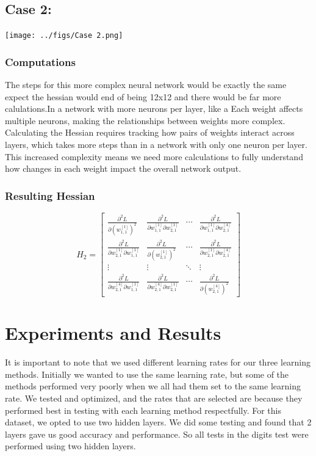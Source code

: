 \documentclass{article}
\begin{document}
\subsection{Case 2:}

\texttt{[image: ../figs/Case 2.png]} \\[0.5cm]

\subsubsection{Computations}
The steps for this more complex neural network would be exactly the same expect the hessian would end of being 12x12 and there would be far more calulations.In a network with more neurons per layer, like a Each weight affects multiple neurons, making the relationships between weights more complex. Calculating the Hessian requires tracking how pairs of weights interact across layers, which takes more steps than in a network with only one neuron per layer. This increased complexity means we need more calculations to fully understand how changes in each weight impact the overall network output.

\subsubsection{Resulting Hessian}
\[
H_2 = \begin{bmatrix}
\frac{\partial^2 L}{\partial (w_{1,1}^{[1]})^2} & \frac{\partial^2 L}{\partial w_{1,1}^{[1]} \partial w_{2,1}^{[1]}} & \cdots & \frac{\partial^2 L}{\partial w_{1,1}^{[1]} \partial w_{2,1}^{[4]}} \\
\frac{\partial^2 L}{\partial w_{2,1}^{[1]} \partial w_{1,1}^{[1]}} & \frac{\partial^2 L}{\partial (w_{2,1}^{[1]})^2} & \cdots & \frac{\partial^2 L}{\partial w_{2,1}^{[1]} \partial w_{2,1}^{[4]}} \\
\vdots & \vdots & \ddots & \vdots \\
\frac{\partial^2 L}{\partial w_{2,1}^{[4]} \partial w_{1,1}^{[1]}} & \frac{\partial^2 L}{\partial w_{2,1}^{[4]} \partial w_{2,1}^{[1]}} & \cdots & \frac{\partial^2 L}{\partial (w_{2,1}^{[4]})^2}
\end{bmatrix}
\]
\section{Experiments and Results}

It is important to note that we used different learning rates for our three learning methods. Initially we wanted to use the same learning rate, but some of the methods performed very poorly when we all had them set to the same learning rate. We tested and optimized, and the rates that are selected are because they performed best in testing with each learning method respectfully. For this dataset, we opted to use two hidden layers. We did some testing and found that 2 layers gave us good accuracy and performance. So all tests in the digits test were performed using two hidden layers.
\end{document}
